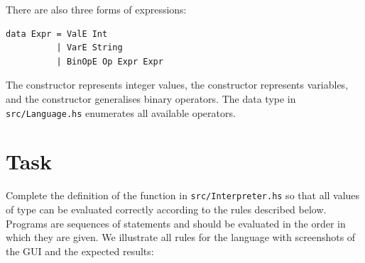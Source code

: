 There are also three forms of expressions:
\begin{verbatim}
data Expr = ValE Int
          | VarE String
          | BinOpE Op Expr Expr
\end{verbatim}
The  constructor represents integer values, the  constructor represents variables, and the  constructor generalises binary operators. The  data type in \texttt{\small src/Language.hs} enumerates all available operators.

\section{Task}

Complete the definition of the  function in \texttt{\small src/Interpreter.hs} so that all values of type  can be evaluated correctly according to the rules described below. Programs are sequences of statements and should be evaluated in the order in which they are given. We illustrate all rules for the language with screenshots of the GUI and the expected results:

